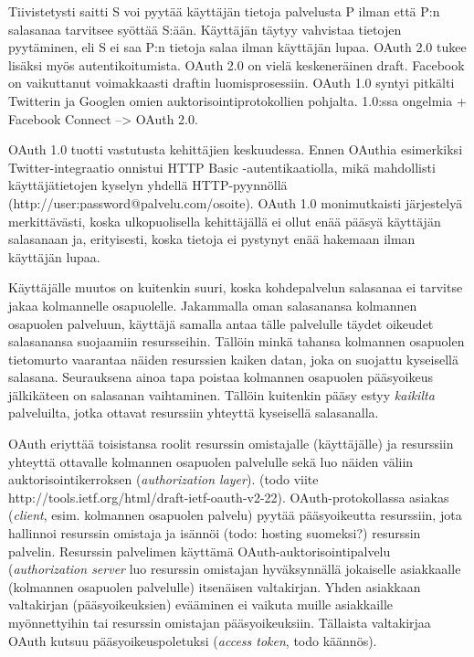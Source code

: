 \documentclass[finnish,gradu]{tktltiki}
\begin{document}
  Tiivistetysti saitti S voi pyytää käyttäjän tietoja palvelusta P ilman että P:n salasanaa tarvitsee syöttää S:ään. Käyttäjän täytyy vahvistaa tietojen pyytäminen, eli S ei saa P:n tietoja salaa ilman käyttäjän lupaa.
  OAuth 2.0 tukee lisäksi myös autentikoitumista. OAuth 2.0 on vielä keskeneräinen draft. Facebook on vaikuttanut voimakkaasti draftin luomisprosessiin. OAuth 1.0 syntyi pitkälti Twitterin ja Googlen omien auktorisointiprotokollien pohjalta. 1.0:ssa ongelmia + Facebook Connect --> OAuth 2.0.

  OAuth 1.0 tuotti vastutusta kehittäjien keskuudessa. Ennen OAuthia esimerkiksi Twitter-integraatio onnistui HTTP Basic -autentikaatiolla, mikä mahdollisti käyttäjätietojen kyselyn yhdellä HTTP-pyynnöllä (http://user:password@palvelu.com/osoite). OAuth 1.0 monimutkaisti järjestelyä merkittävästi, koska ulkopuolisella kehittäjällä ei ollut enää pääsyä käyttäjän salasanaan ja, erityisesti, koska tietoja ei pystynyt enää hakemaan ilman käyttäjän lupaa.

  Käyttäjälle muutos on kuitenkin suuri, koska kohdepalvelun salasanaa ei tarvitse jakaa kolmannelle osapuolelle. Jakammalla oman salasanansa kolmannen osapuolen palveluun, käyttäjä samalla antaa tälle palvelulle täydet oikeudet salasanansa suojaamiin resursseihin. Tällöin minkä tahansa kolmannen osapuolen tietomurto vaarantaa näiden resurssien kaiken datan, joka on suojattu kyseisellä salasana. Seurauksena ainoa tapa poistaa kolmannen osapuolen pääsyoikeus jälkikäteen on salasanan vaihtaminen. Tällöin kuitenkin pääsy estyy \emph{kaikilta} palveluilta, jotka ottavat resurssiin yhteyttä kyseisellä salasanalla.

  OAuth eriyttää toisistansa roolit resurssin omistajalle (käyttäjälle) ja resurssiin yhteyttä ottavalle kolmannen osapuolen palvelulle sekä luo näiden väliin auktorisointikerroksen (\emph{authorization layer}). (todo viite http://tools.ietf.org/html/draft-ietf-oauth-v2-22). OAuth-protokollassa asiakas (\emph{client}, esim. kolmannen osapuolen palvelu) pyytää pääsyoikeutta resurssiin, jota hallinnoi resurssin omistaja ja isännöi (todo: hosting suomeksi?) resurssin palvelin. Resurssin palvelimen käyttämä OAuth-auktorisointipalvelu (\emph{authorization server} luo resurssin omistajan hyväksynnällä jokaiselle asiakkaalle (kolmannen osapuolen palvelulle) itsenäisen valtakirjan. Yhden asiakkaan valtakirjan (pääsyoikeuksien) evääminen ei vaikuta muille asiakkaille myönnettyihin tai resurssin omistajan pääsyoikeuksiin. Tällaista valtakirjaa OAuth kutsuu pääsyoikeuspoletuksi (\emph{access token}, todo käännös).
\end{document}
